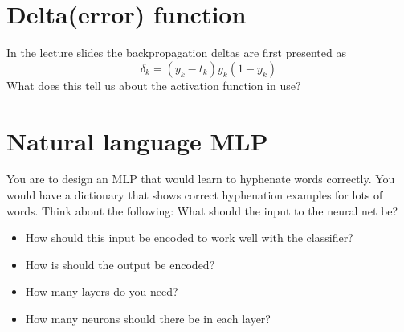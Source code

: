 \documentclass{article}           %
\begin{document}
\section{Delta(error) function}
In the lecture slides the backpropagation deltas are first presented as
\[
\delta_k = (y_k - t_k)y_k(1-y_k)
\]
What does this tell us about the activation function in use?

\section{Natural language MLP}
You are to design an MLP that would learn to hyphenate words correctly.
You would have a dictionary that shows correct hyphenation examples for lots of words.
Think about the following:
What should the input to the neural net be?
\begin{itemize}
    \item How should this input be encoded to work well with the classifier?
    \item How is should the output be encoded?
    \item How many layers do you need?
    \item How many neurons should there be in each layer?
\end{itemize}

\end{document}
